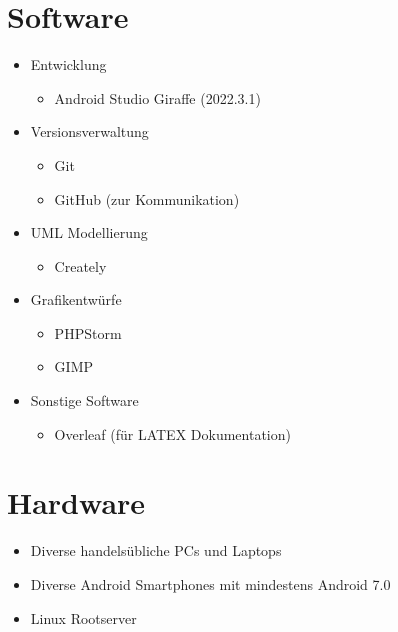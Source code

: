 \documentclass[oneside, ngerman]{sdqtechreport}
\begin{document}
\section{Software}
\label{sec:Entwicklungsumgebung:Software}

\begin{itemize}
    \item Entwicklung
    \begin{itemize}
        \item Android Studio Giraffe (2022.3.1)
    \end{itemize}
    
    \item Versionsverwaltung
    \begin{itemize}
        \item Git
        \item GitHub (zur Kommunikation)
    \end{itemize}

    \item UML Modellierung
    \begin{itemize}
        \item Creately
    \end{itemize}

    \item Grafikentwürfe
    \begin{itemize}
        \item PHPStorm
        \item GIMP
    \end{itemize}

    \item Sonstige Software
    \begin{itemize}
        \item Overleaf (für LATEX Dokumentation)
    \end{itemize}
    
\end{itemize}

\section{Hardware}
\label{sec:Entwicklungsumgebung:Hardware}

\begin{itemize}
    \item Diverse handelsübliche PCs und Laptops
    \item Diverse Android Smartphones mit mindestens Android 7.0
    \item Linux Rootserver
\end{itemize}
\end{document}
